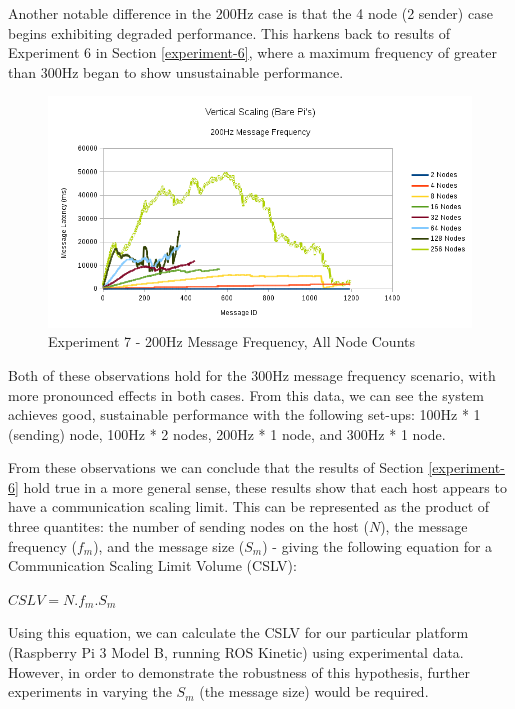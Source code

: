 \documentclass[../dissertation.tex]{subfiles}
\begin{document}
Another notable difference in the 200Hz case is that the 4 node (2 sender) case begins exhibiting degraded performance. This harkens back to results of Experiment 6 in Section \ref{experiment-6}, where a maximum frequency of greater than 300Hz began to show unsustainable performance.

\begin{figure}[H]
\centering
\includegraphics[width=\textwidth]{images/experiment7/vertical_scaling_200hz_all_node_counts.png}
\caption{Experiment 7 - 200Hz Message Frequency, All Node Counts}
\label{exp7-200hz-allnodes}
\end{figure}

Both of these observations hold for the 300Hz message frequency scenario, with more pronounced effects in both cases. From this data, we can see the system achieves good, sustainable performance with the following set-ups: 100Hz * 1 (sending) node, 100Hz * 2 nodes, 200Hz * 1 node, and 300Hz * 1 node.

From these observations we can conclude that the results of Section \ref{experiment-6} hold true in a more general sense, these results show that each host appears to have a communication scaling limit. This can be represented as the product of three quantites: the number of sending nodes on the host ($N$), the message frequency ($f_m$), and the message size ($S_m$) - giving the following equation for a Communication Scaling Limit Volume (CSLV):

\begin{center}
$CSLV = N . f_m . S_m$
\end{center}

Using this equation, we can calculate the CSLV for our particular platform (Raspberry Pi 3 Model B, running ROS Kinetic) using experimental data. However, in order to demonstrate the robustness of this hypothesis, further experiments in varying the $S_m$ (the message size) would be required.
\end{document}
